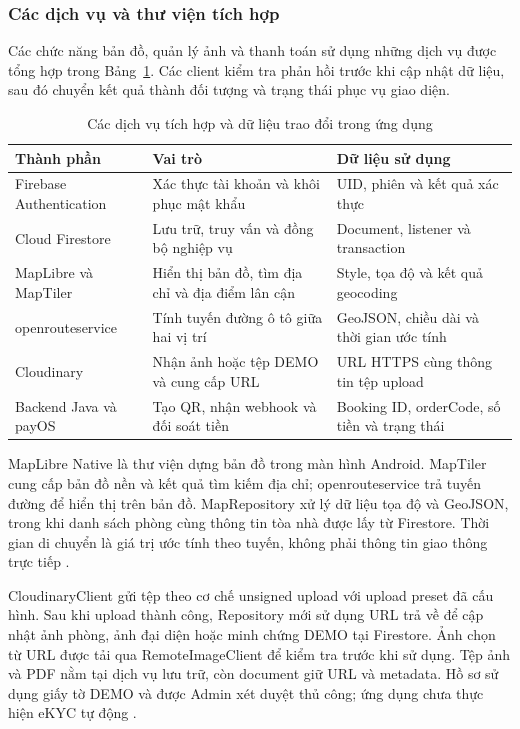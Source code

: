 \subsubsection{Các dịch vụ và thư viện tích hợp}
Các chức năng bản đồ, quản lý ảnh và thanh toán sử dụng những dịch vụ được tổng hợp trong Bảng~\ref{tab:implemented-services}. Các client kiểm tra phản hồi trước khi cập nhật dữ liệu, sau đó chuyển kết quả thành đối tượng và trạng thái phục vụ giao diện.

\begin{table}[htbp]
\centering\small
\caption{Các dịch vụ tích hợp và dữ liệu trao đổi trong ứng dụng}
\label{tab:implemented-services}
\begin{tabularx}{\linewidth}{@{}p{3.1cm}XX@{}}
\toprule
Thành phần & Vai trò & Dữ liệu sử dụng \\
\midrule
\makecell[l]{Firebase\\Authentication} & Xác thực tài khoản và khôi phục mật khẩu & UID, phiên và kết quả xác thực \\
Cloud Firestore & Lưu trữ, truy vấn và đồng bộ nghiệp vụ & Document, listener và transaction \\
\makecell[l]{MapLibre và\\MapTiler} & Hiển thị bản đồ, tìm địa chỉ và địa điểm lân cận & Style, tọa độ và kết quả geocoding \\
openrouteservice & Tính tuyến đường ô tô giữa hai vị trí & GeoJSON, chiều dài và thời gian ước tính \\
Cloudinary & Nhận ảnh hoặc tệp DEMO và cung cấp URL & URL HTTPS cùng thông tin tệp upload \\
Backend Java và payOS & Tạo QR, nhận webhook và đối soát tiền & Booking ID, orderCode, số tiền và trạng thái \\
\bottomrule
\end{tabularx}
\end{table}

MapLibre Native là thư viện dựng bản đồ trong màn hình Android. MapTiler cung cấp bản đồ nền và kết quả tìm kiếm địa chỉ; openrouteservice trả tuyến đường để hiển thị trên bản đồ. MapRepository xử lý dữ liệu tọa độ và GeoJSON, trong khi danh sách phòng cùng thông tin tòa nhà được lấy từ Firestore. Thời gian di chuyển là giá trị ước tính theo tuyến, không phải thông tin giao thông trực tiếp \parencite{maplibre_android,maptiler_geocoding,ors_directions}.

CloudinaryClient gửi tệp theo cơ chế unsigned upload với upload preset đã cấu hình. Sau khi upload thành công, Repository mới sử dụng URL trả về để cập nhật ảnh phòng, ảnh đại diện hoặc minh chứng DEMO tại Firestore. Ảnh chọn từ URL được tải qua RemoteImageClient để kiểm tra trước khi sử dụng. Tệp ảnh và PDF nằm tại dịch vụ lưu trữ, còn document giữ URL và metadata. Hồ sơ sử dụng giấy tờ DEMO và được Admin xét duyệt thủ công; ứng dụng chưa thực hiện eKYC tự động \parencite{cloudinary_unsigned}.

